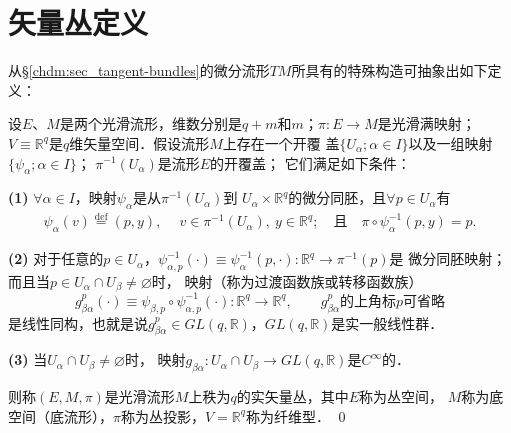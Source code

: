     


\section{矢量丛定义}\label{chfb:sec_vector-bundles}

从\S \ref{chdm:sec_tangent-bundles}的微分流形$TM$所具有的特殊构造可抽象出如下定义：
\begin{definition}\label{chfb:def_vector-bundles}
    设$E$、$M$是两个光滑流形，维数分别是$q+m$和$m$；$\pi:E\to M$是光滑满映射；
    $V\equiv \mathbb{R}^q$是$q$维矢量空间．假设流形$M$上存在一个开覆
    盖$\{U_\alpha; \alpha\in I\}$以及一组映射$\{\psi_\alpha; \alpha\in I\}$；
    $\pi^{-1}(U_\alpha)$是流形$E$的开覆盖；
    它们满足如下条件：
    
    {\bfseries (1)} $\forall \alpha \in I$，映射$\psi_\alpha$是从$\pi^{-1}(U_\alpha)$到
    $U_\alpha \times \mathbb{R}^q$的微分同胚，且$\forall p \in U_\alpha$有
    \begin{align*}
        \psi_\alpha\left(v\right) \overset{\mathrm {def}}{=} \left(p, y \right),
        \quad \ v\in \pi^{-1} (U_\alpha),\ y \in \mathbb{R}^q ; 
        \quad \text{且}\quad
        \pi \circ \psi_\alpha^{-1} (p,y) = p.
    \end{align*}
    
    {\bfseries (2)} 对于任意的$p\in U_\alpha$，$\psi^{-1}_{\alpha,p}(\cdot)\equiv 
    \psi^{-1}_\alpha(p,\cdot):\mathbb{R}^q\to \pi^{-1}(p)$是
    微分同胚映射；而且当$p\in U_\alpha \cap U_\beta \neq \varnothing$时，
    映射（称为{\heiti 过渡函数族}或转移函数族）
    \begin{equation*}
        g^p_{\beta\alpha} (\cdot)
        \equiv \psi_{\beta,p} \circ \psi^{-1}_{\alpha,p}(\cdot ) : \mathbb{R}^q\to\mathbb{R}^q ,
        \qquad g^p_{\beta\alpha}\text{的上角标$p$可省略}
    \end{equation*}
    是线性同构，也就是说$g^p_{\beta\alpha}\in GL(q,\mathbb{R})$，$GL(q,\mathbb{R})$是{\kaishu 实}一般线性群．
    
    {\bfseries (3)} 当$U_\alpha \cap U_\beta \neq \varnothing$时，
    映射$g_{\beta\alpha}: U_\alpha \cap U_\beta \to GL(q,\mathbb{R})$是$C^\infty$的．
    
    则称$(E,M,\pi)$是光滑流形$M$上秩为$q$的实{\heiti 矢量丛}，其中$E$称为{\heiti 丛空间}，
    $M$称为{\heiti 底空间}（底流形），$\pi$称为{\heiti 丛投影}，$V=\mathbb{R}^q$称为{\heiti 纤维型}．
\qed
\end{definition}

